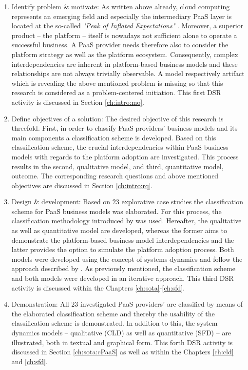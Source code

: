 \begin{enumerate}
	\item Identify problem \& motivate: As written above already, cloud computing represents an emerging field and especially the intermediary \ac{PaaS} layer is located at the so-called \textit{"Peak of Inflated Expectations"} \citep[p. 5]{Smith2012}. Moreover, a superior product -- the platform -- itself is nowadays not sufficient alone to operate a successful business. A \ac{PaaS} provider needs therefore also to consider the platform strategy as well as the platform ecosystem. Consequently, complex interdependencies are inherent in platform-based business models and these relationships are not always trivially observable. A model respectively artifact which is revealing the above mentioned problem is missing so that this research is considered as a problem-centered initiation. This first \ac{DSR} activity is discussed in Section \ref{ch:intro:mo}.
	\item Define objectives of a solution: The desired objective of this research is threefold. First, in order to classify \ac{PaaS} providers' business models and its main components a classification scheme is developed. Based on this classification scheme, the crucial interdependencies within \ac{PaaS} business models with regards to the platform adoption are investigated. This process results in the second, qualitative model, and third, quantitative model, outcome. The corresponding research questions and above mentioned objectives are discussed in Section \ref{ch:intro:rq}.
	\item Design \& development: Based on 23 explorative case studies the classification scheme for \ac{PaaS} business models was elaborated. For this process, the classification methodology introduced by \citet{Fettke2003} was used. Hereafter, the qualitative as well as quantitative model are developed, whereas the former aims to demonstrate the platform-based business model interdependencies and the latter provides the option to simulate the platform adoption process. Both models were developed using the concept of systems dynamics and follow the approach described by \citet{Sterman2000}. As previously mentioned, the classification scheme and both models were developed in an iterative approach. This third \ac{DSR} activity is discussed within the Chapters \ref{ch:sota}-\ref{ch:sfd}.
	\item Demonstration: All 23 investigated \ac{PaaS} providers' are classified by means of the elaborated classification scheme and thereby the usability of the classification scheme is demonstrated. In addition to this, the system dynamics models -- qualitative (\ac{CLD}) as well as quantitative (\ac{SFD}) -- are illustrated, both in textual and graphical form. This forth \ac{DSR} activity is discussed in Section \ref{ch:sota:cPaaS} as well as within the Chapters \ref{ch:cld} and \ref{ch:sfd}.

\end{enumerate}
